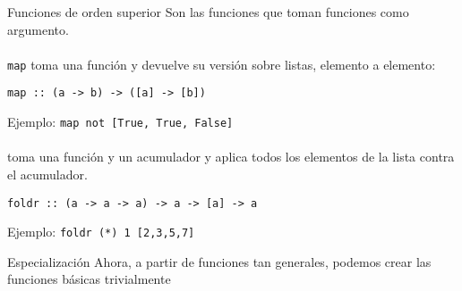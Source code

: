 \begin{frame}[fragile]{Funciones de orden superior}
  Son las funciones que toman funciones como argumento.
  \\~\\
  \texttt{map} toma una función y devuelve su versión sobre listas,
  elemento a elemento:
  \begin{lstlisting}
map :: (a -> b) -> ([a] -> [b])
  \end{lstlisting}
  Ejemplo: \texttt{map not [True, True, False]}
  \\~\\
   toma una función y un acumulador y aplica todos los elementos
  de la lista contra el acumulador.
  \begin{lstlisting}
foldr :: (a -> a -> a) -> a -> [a] -> a
  \end{lstlisting}
  Ejemplo: \texttt{foldr (*) 1 [2,3,5,7]}
\end{frame}

\begin{frame}[fragile]{Especialización}
  Ahora, a partir de funciones tan generales, podemos crear las funciones básicas
  trivialmente
\end{frame}